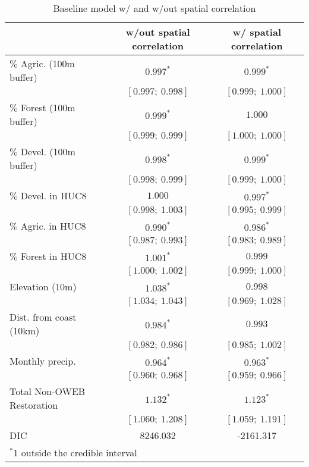 
\begin{table}
\caption{Baseline model w/ and w/out spatial correlation}
\begin{center}
\begin{tabular}{l c c }
\hline
                           & w/out spatial correlation & w/ spatial correlation \\
\hline
$\%$  Agric. (100m buffer) & $0.997^{*}$       & $0.999^{*}$       \\
                           & $[0.997;\ 0.998]$ & $[0.999;\ 1.000]$ \\
$\%$  Forest (100m buffer) & $0.999^{*}$       & $1.000$           \\
                           & $[0.999;\ 0.999]$ & $[1.000;\ 1.000]$ \\
$\%$  Devel. (100m buffer) & $0.998^{*}$       & $0.999^{*}$       \\
                           & $[0.998;\ 0.999]$ & $[0.999;\ 1.000]$ \\
$\%$  Devel. in HUC8       & $1.000$           & $0.997^{*}$       \\
                           & $[0.998;\ 1.003]$ & $[0.995;\ 0.999]$ \\
$\%$  Agric. in HUC8       & $0.990^{*}$       & $0.986^{*}$       \\
                           & $[0.987;\ 0.993]$ & $[0.983;\ 0.989]$ \\
$\%$  Forest in HUC8       & $1.001^{*}$       & $0.999$           \\
                           & $[1.000;\ 1.002]$ & $[0.999;\ 1.000]$ \\
Elevation (10m)            & $1.038^{*}$       & $0.998$           \\
                           & $[1.034;\ 1.043]$ & $[0.969;\ 1.028]$ \\
Dist. from coast (10km)    & $0.984^{*}$       & $0.993$           \\
                           & $[0.982;\ 0.986]$ & $[0.985;\ 1.002]$ \\
Monthly precip.            & $0.964^{*}$       & $0.963^{*}$       \\
                           & $[0.960;\ 0.968]$ & $[0.959;\ 0.966]$ \\
Total Non-OWEB Restoration & $1.132^{*}$       & $1.123^{*}$       \\
                           & $[1.060;\ 1.208]$ & $[1.059;\ 1.191]$ \\
\hline
DIC                        & 8246.032          & -2161.317         \\
\hline
\multicolumn{3}{l}{\scriptsize{$^* 1$ outside the credible interval}}
\end{tabular}
\label{table:basemods}
\end{center}
\end{table}
